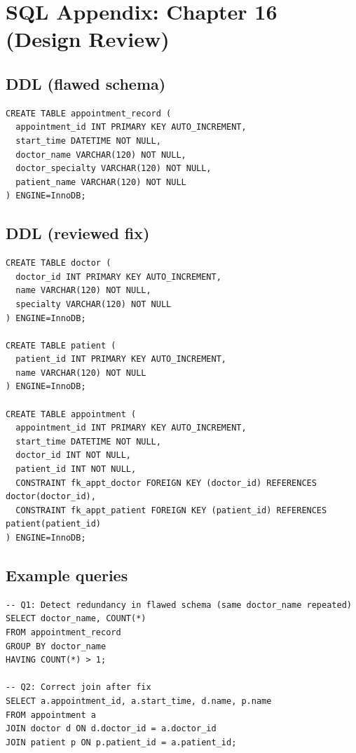 \chapter{SQL Appendix: Chapter 16 (Design Review)}

\section{DDL (flawed schema)}
\begin{verbatim}
CREATE TABLE appointment_record (
  appointment_id INT PRIMARY KEY AUTO_INCREMENT,
  start_time DATETIME NOT NULL,
  doctor_name VARCHAR(120) NOT NULL,
  doctor_specialty VARCHAR(120) NOT NULL,
  patient_name VARCHAR(120) NOT NULL
) ENGINE=InnoDB;
\end{verbatim}

\section{DDL (reviewed fix)}
\begin{verbatim}
CREATE TABLE doctor (
  doctor_id INT PRIMARY KEY AUTO_INCREMENT,
  name VARCHAR(120) NOT NULL,
  specialty VARCHAR(120) NOT NULL
) ENGINE=InnoDB;

CREATE TABLE patient (
  patient_id INT PRIMARY KEY AUTO_INCREMENT,
  name VARCHAR(120) NOT NULL
) ENGINE=InnoDB;

CREATE TABLE appointment (
  appointment_id INT PRIMARY KEY AUTO_INCREMENT,
  start_time DATETIME NOT NULL,
  doctor_id INT NOT NULL,
  patient_id INT NOT NULL,
  CONSTRAINT fk_appt_doctor FOREIGN KEY (doctor_id) REFERENCES doctor(doctor_id),
  CONSTRAINT fk_appt_patient FOREIGN KEY (patient_id) REFERENCES patient(patient_id)
) ENGINE=InnoDB;
\end{verbatim}

\section{Example queries}
\begin{verbatim}
-- Q1: Detect redundancy in flawed schema (same doctor_name repeated)
SELECT doctor_name, COUNT(*)
FROM appointment_record
GROUP BY doctor_name
HAVING COUNT(*) > 1;

-- Q2: Correct join after fix
SELECT a.appointment_id, a.start_time, d.name, p.name
FROM appointment a
JOIN doctor d ON d.doctor_id = a.doctor_id
JOIN patient p ON p.patient_id = a.patient_id;
\end{verbatim}

